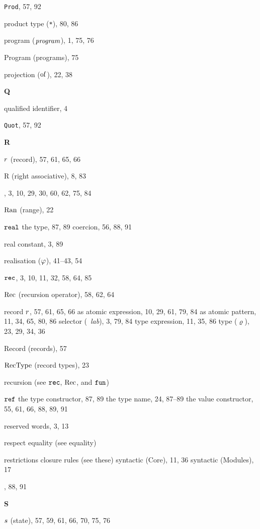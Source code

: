 \begin{theindex}
\item {\tt Prod}, 57, 92
\item product type (\verb+*+), 80, 86
\item program (${\it program}$), 1, 75, 76
\item Program (programs), 75
\item projection ($\mathbin{\rm of}$), 22, 38
\indexspace
\parbox{65mm}{\hfil{\large\bf Q}\hfil}
\indexspace
\item qualified identifier, 4
\item {\tt Quot}, 57, 92
\indexspace
\parbox{65mm}{\hfil{\large\bf R}\hfil}
\indexspace
\item $r$ (record), 57, 61, 65, 66
\item R (right associative), 8, 83
\item \RAISE, 3, 10, 29, 30, 60, 62, 75, 84
\item $\mathop{\rm Ran}\nolimits$ (range), 22
\item $\mbox{\tt real}$ 
\subitem the type, 87, 89
\subitem coercion, 56, 88, 91
\item real constant, 3, 89
\item realisation ($\varphi$), 41--43, 54
\item ${\tt rec}$, 3, 10, 11, 32, 58, 64, 85
\item $\mathop{\rm Rec}\nolimits$ (recursion operator), 58, 62, 64
\item record  
\subitem $r$, 57, 61, 65, 66
\subitem as atomic expression, 10, 29, 61, 79, 84
\subitem as atomic pattern, 11, 34, 65, 80, 86
\subitem selector (\ml{\#}\ {\it lab}), 3, 79, 84
\subitem type expression, 11, 35, 86
\subitem type ($\varrho$), 23, 29, 34, 36
\item Record (records), 57
\item ${\rm RecType}$ (record types), 23
\item recursion (see ${\tt rec}$, $\mathop{\rm Rec}\nolimits$, and ${\tt fun}$) 
\item $\mbox{\tt ref}$ 
\subitem the type constructor, 87, 89
\subitem the type name, 24, 87--89
\subitem the value constructor, 55, 61, 66, 88, 89, 91
\item reserved words, 3, 13
\item respect equality (see equality) 
\item restrictions 
\subitem closure rules (see these) 
\subitem syntactic (Core), 11, 36
\subitem syntactic (Modules), 17
\item {}, 88, 91
\indexspace
\parbox{65mm}{\hfil{\large\bf S}\hfil}
\indexspace
\item $s$ (state), 57, 59, 61, 66, 70, 75, 76

\end{theindex}
